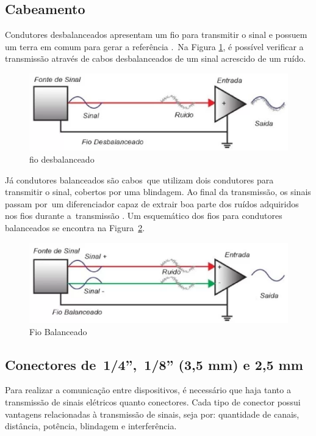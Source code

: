 \subsection{Cabeamento}

Condutores desbalanceados apresentam um fio para transmitir o sinal e possuem um terra em comum para gerar a referência \cite{bartlett}. Na Figura \ref{fig12}, é possível verificar a transmissão através de cabos desbalanceados de um sinal acrescido de um ruído.

\begin{figure}[h]
	\centering
    \includegraphics[scale=0.4]{figuras/fig11.eps}
	\caption{fio desbalanceado}
	\label{fig12}
\end{figure}

Já condutores balanceados são cabos que utilizam dois condutores para transmitir o sinal, cobertos por uma blindagem. Ao final da transmissão, os sinais passam por um diferenciador capaz de extrair boa parte dos ruídos adquiridos nos fios durante a transmissão \cite{bartlett}. Um esquemático dos fios para condutores balanceados se encontra na Figura \ref{fig11}.

\begin{figure}[h]
	\centering
    \includegraphics[scale=0.4]{figuras/fig12.eps}
	\caption{Fio Balanceado}
	\label{fig11}
\end{figure}

\subsection{Conectores de 1/4”, 1/8” (3,5 mm) e 2,5 mm}

Para realizar a comunicação entre dispositivos, é necessário que haja tanto a transmissão de sinais elétricos quanto conectores. Cada tipo de conector possui vantagens relacionadas à transmissão de sinais, seja por: quantidade de canais, distância, potência, blindagem e interferência.


